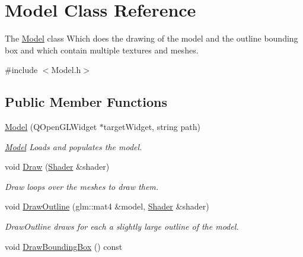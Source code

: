 \hypertarget{class_model}{}\section{Model Class Reference}
\label{class_model}


The \hyperlink{class_model}{Model} class Which does the drawing of the model and the outline bounding box and which contain multiple textures and meshes.  




{\ttfamily \#include $<$Model.\+h$>$}

\subsection*{Public Member Functions}
\begin{DoxyCompactItemize}
\item 
\hyperlink{class_model_a305581f2c1f2e77addbc7e436961c6dc}{Model} (Q\+Open\+G\+L\+Widget $\ast$target\+Widget, string path)
\begin{DoxyCompactList}\small\item\em \hyperlink{class_model}{Model} Loads and populates the model. \end{DoxyCompactList}\item 
void \hyperlink{class_model_a9c66de8af7e48fefaccbb8a056ec3c1d}{Draw} (\hyperlink{class_shader}{Shader} \&shader)
\begin{DoxyCompactList}\small\item\em Draw loops over the meshes to draw them. \end{DoxyCompactList}\item 
void \hyperlink{class_model_a3ecdedb61ab3d622243ca0fcc900675f}{Draw\+Outline} (glm\+::mat4 \&model, \hyperlink{class_shader}{Shader} \&shader)
\begin{DoxyCompactList}\small\item\em Draw\+Outline draws for each a slightly large outline of the model. \end{DoxyCompactList}\item 
\hypertarget{class_model_a9ea10d4e794c767d6fd2c3e69dde742a}{}void \hyperlink{class_model_a9ea10d4e794c767d6fd2c3e69dde742a}{Draw\+Bounding\+Box} () const \label{class_model_a9ea10d4e794c767d6fd2c3e69dde742a}


\end{DoxyCompactItemize}
